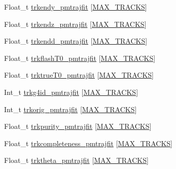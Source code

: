 \begin{DoxyCompactItemize}
\item 
Float\-\_\-t \hyperlink{classanatree_aa95a52db37ca5f4abd1070ec5ae99a35}{trkendy\-\_\-pmtrajfit} \mbox{[}\hyperlink{anatree__core__v09410002__orig_8h_a327fd4e796e4a0d78947524c96e4362e}{M\-A\-X\-\_\-\-T\-R\-A\-C\-K\-S}\mbox{]}
\item 
Float\-\_\-t \hyperlink{classanatree_a655cddde7ff2c9ecce9a539d996980be}{trkendz\-\_\-pmtrajfit} \mbox{[}\hyperlink{anatree__core__v09410002__orig_8h_a327fd4e796e4a0d78947524c96e4362e}{M\-A\-X\-\_\-\-T\-R\-A\-C\-K\-S}\mbox{]}
\item 
Float\-\_\-t \hyperlink{classanatree_a3e0fb36f19136b68a9469c9d4025b0f4}{trkendd\-\_\-pmtrajfit} \mbox{[}\hyperlink{anatree__core__v09410002__orig_8h_a327fd4e796e4a0d78947524c96e4362e}{M\-A\-X\-\_\-\-T\-R\-A\-C\-K\-S}\mbox{]}
\item 
Float\-\_\-t \hyperlink{classanatree_a748b0c21758252c868608c7eca3224ce}{trkflash\-T0\-\_\-pmtrajfit} \mbox{[}\hyperlink{anatree__core__v09410002__orig_8h_a327fd4e796e4a0d78947524c96e4362e}{M\-A\-X\-\_\-\-T\-R\-A\-C\-K\-S}\mbox{]}
\item 
Float\-\_\-t \hyperlink{classanatree_ae6494d9f988552257ca4832ec3a3397a}{trktrue\-T0\-\_\-pmtrajfit} \mbox{[}\hyperlink{anatree__core__v09410002__orig_8h_a327fd4e796e4a0d78947524c96e4362e}{M\-A\-X\-\_\-\-T\-R\-A\-C\-K\-S}\mbox{]}
\item 
Int\-\_\-t \hyperlink{classanatree_aa38ed08a2ecead6d77295bc1b2e16b61}{trkg4id\-\_\-pmtrajfit} \mbox{[}\hyperlink{anatree__core__v09410002__orig_8h_a327fd4e796e4a0d78947524c96e4362e}{M\-A\-X\-\_\-\-T\-R\-A\-C\-K\-S}\mbox{]}
\item 
Int\-\_\-t \hyperlink{classanatree_af73683d3cd8d9744249a2e982e8d368e}{trkorig\-\_\-pmtrajfit} \mbox{[}\hyperlink{anatree__core__v09410002__orig_8h_a327fd4e796e4a0d78947524c96e4362e}{M\-A\-X\-\_\-\-T\-R\-A\-C\-K\-S}\mbox{]}
\item 
Float\-\_\-t \hyperlink{classanatree_ad62e41cc71946eba049a853e9e661d7d}{trkpurity\-\_\-pmtrajfit} \mbox{[}\hyperlink{anatree__core__v09410002__orig_8h_a327fd4e796e4a0d78947524c96e4362e}{M\-A\-X\-\_\-\-T\-R\-A\-C\-K\-S}\mbox{]}
\item 
Float\-\_\-t \hyperlink{classanatree_a976a694f65f7f57d49f1565b2cc002f4}{trkcompleteness\-\_\-pmtrajfit} \mbox{[}\hyperlink{anatree__core__v09410002__orig_8h_a327fd4e796e4a0d78947524c96e4362e}{M\-A\-X\-\_\-\-T\-R\-A\-C\-K\-S}\mbox{]}
\item 
Float\-\_\-t \hyperlink{classanatree_ae5ad98ca775aae6971d1aacb0581eb38}{trktheta\-\_\-pmtrajfit} \mbox{[}\hyperlink{anatree__core__v09410002__orig_8h_a327fd4e796e4a0d78947524c96e4362e}{M\-A\-X\-\_\-\-T\-R\-A\-C\-K\-S}\mbox{]}

\end{DoxyCompactItemize}
